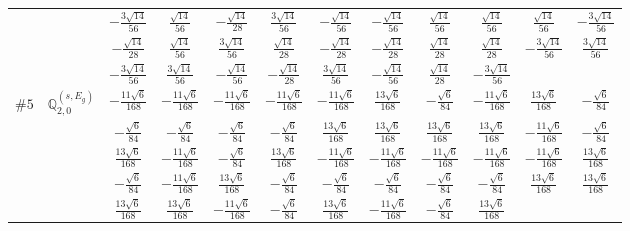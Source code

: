 \documentclass[fleqn,9pt,landscape]{jsarticle}
\begin{document}
\begin{center}
\begin{longtable}{lcccccccccc}
& $ - \frac{3 \sqrt{14}}{56} $ & $ \frac{\sqrt{14}}{56} $ & $ - \frac{\sqrt{14}}{28} $ & $ \frac{3 \sqrt{14}}{56} $ & $ - \frac{\sqrt{14}}{56} $ & $ - \frac{\sqrt{14}}{56} $ & $ \frac{\sqrt{14}}{56} $ & $ \frac{\sqrt{14}}{56} $ & $ \frac{\sqrt{14}}{56} $ & $ - \frac{3 \sqrt{14}}{56} $ \\
& $ - \frac{\sqrt{14}}{28} $ & $ \frac{\sqrt{14}}{56} $ & $ \frac{3 \sqrt{14}}{56} $ & $ \frac{\sqrt{14}}{28} $ & $ - \frac{\sqrt{14}}{28} $ & $ - \frac{\sqrt{14}}{28} $ & $ \frac{\sqrt{14}}{28} $ & $ \frac{\sqrt{14}}{28} $ & $ - \frac{3 \sqrt{14}}{56} $ & $ \frac{3 \sqrt{14}}{56} $ \\
& $ - \frac{3 \sqrt{14}}{56} $ & $ \frac{3 \sqrt{14}}{56} $ & $ - \frac{\sqrt{14}}{56} $ & $ - \frac{\sqrt{14}}{28} $ & $ \frac{3 \sqrt{14}}{56} $ & $ - \frac{\sqrt{14}}{56} $ & $ \frac{\sqrt{14}}{28} $ & $ - \frac{3 \sqrt{14}}{56} $ & $  $ & $  $ \\ \hline
$ \#5\quad \mathbb{Q}_{2,0}^{(s,E_{g})} $ & $ - \frac{11 \sqrt{6}}{168} $ & $ - \frac{11 \sqrt{6}}{168} $ & $ - \frac{11 \sqrt{6}}{168} $ & $ - \frac{11 \sqrt{6}}{168} $ & $ - \frac{11 \sqrt{6}}{168} $ & $ \frac{13 \sqrt{6}}{168} $ & $ - \frac{\sqrt{6}}{84} $ & $ - \frac{11 \sqrt{6}}{168} $ & $ \frac{13 \sqrt{6}}{168} $ & $ - \frac{\sqrt{6}}{84} $ \\
& $ - \frac{\sqrt{6}}{84} $ & $ - \frac{\sqrt{6}}{84} $ & $ - \frac{\sqrt{6}}{84} $ & $ - \frac{\sqrt{6}}{84} $ & $ \frac{13 \sqrt{6}}{168} $ & $ \frac{13 \sqrt{6}}{168} $ & $ \frac{13 \sqrt{6}}{168} $ & $ \frac{13 \sqrt{6}}{168} $ & $ - \frac{11 \sqrt{6}}{168} $ & $ - \frac{\sqrt{6}}{84} $ \\
& $ \frac{13 \sqrt{6}}{168} $ & $ - \frac{11 \sqrt{6}}{168} $ & $ - \frac{\sqrt{6}}{84} $ & $ \frac{13 \sqrt{6}}{168} $ & $ - \frac{11 \sqrt{6}}{168} $ & $ - \frac{11 \sqrt{6}}{168} $ & $ - \frac{11 \sqrt{6}}{168} $ & $ - \frac{11 \sqrt{6}}{168} $ & $ - \frac{11 \sqrt{6}}{168} $ & $ \frac{13 \sqrt{6}}{168} $ \\
& $ - \frac{\sqrt{6}}{84} $ & $ - \frac{11 \sqrt{6}}{168} $ & $ \frac{13 \sqrt{6}}{168} $ & $ - \frac{\sqrt{6}}{84} $ & $ - \frac{\sqrt{6}}{84} $ & $ - \frac{\sqrt{6}}{84} $ & $ - \frac{\sqrt{6}}{84} $ & $ - \frac{\sqrt{6}}{84} $ & $ \frac{13 \sqrt{6}}{168} $ & $ \frac{13 \sqrt{6}}{168} $ \\
& $ \frac{13 \sqrt{6}}{168} $ & $ \frac{13 \sqrt{6}}{168} $ & $ - \frac{11 \sqrt{6}}{168} $ & $ - \frac{\sqrt{6}}{84} $ & $ \frac{13 \sqrt{6}}{168} $ & $ - \frac{11 \sqrt{6}}{168} $ & $ - \frac{\sqrt{6}}{84} $ & $ \frac{13 \sqrt{6}}{168} $ & $  $ & $  $ \\ \hline

\end{longtable}
\end{center}
\end{document}
